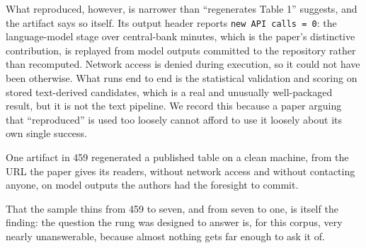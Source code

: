 What reproduced, however, is narrower than ``regenerates Table 1'' suggests, and
the artifact says so itself. Its output header reports \texttt{new API calls =
0}: the language-model stage over central-bank minutes, which is the paper's
distinctive contribution, is replayed from model outputs committed to the
repository rather than recomputed. Network access is denied during execution, so
it could not have been otherwise. What runs end to end is the statistical
validation and scoring on stored text-derived candidates, which is a real and
unusually well-packaged result, but it is not the text pipeline. We record this
because a paper arguing that ``reproduced'' is used too loosely cannot afford to
use it loosely about its own single success.

One artifact in 459 regenerated a published table on a clean machine, from the
URL the paper gives its readers, without network access and without contacting
anyone, on model outputs the authors had the foresight to commit.

That the sample thins from 459 to seven, and from seven to one, is itself the
finding: the question the rung was designed to answer is, for this corpus, very
nearly unanswerable, because almost nothing gets far enough to ask it of.
